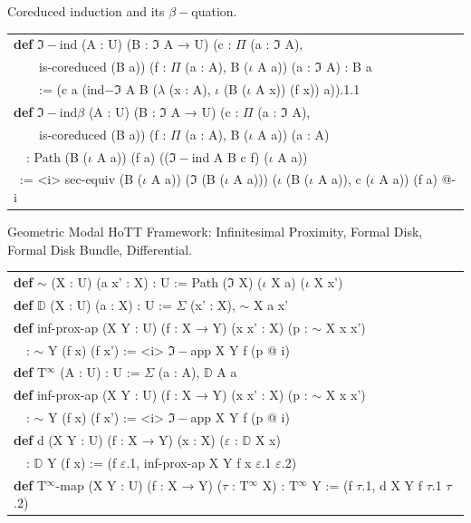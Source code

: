 \documentclass[a4paper,UKenglish,cleveref, autoref, thm-restate]{lipics-v2021}
\newcommand{\tabstyle}[0]{\scriptsize\ttfamily\fontseries{l}\selectfont}
\begin{document}
Coreduced induction and its $\beta-$quation.

\begin{table}[ht!]
\tabstyle
\begin{tabular}{l}
\textbf{def} $\Im-$ind (A : U) (B : $\Im$ A → U) (c : $\Pi$ (a : $\Im$ A), \\
\ \ \ \ is-coreduced (B a)) (f : $\Pi$ (a : A), B ($\iota$ A a)) (a : $\Im$ A) : B a \\
\ \ \ \ := (c a (ind$-\Im$ A B ($\lambda$ (x : A), $\iota$ (B ($\iota$ A x)) (f x)) a)).1.1 \\
\textbf{def} $\Im-$ind$\beta$ (A : U) (B : $\Im$ A → U) (c : $\Pi$ (a : $\Im$ A), \\
\ \ \ \ is-coreduced (B a)) (f : $\Pi$ (a : A), B ($\iota$ A a)) (a : A) \\
\ \ : Path (B ($\iota$ A a)) (f a) (($\Im-$ind A B c f) ($\iota$ A a)) \\
\ := <i> sec-equiv (B ($\iota$ A a)) ($\Im$ (B ($\iota$ A a))) ($\iota$ (B ($\iota$ A a)), c ($\iota$ A a)) (f a) @-i \\
\end{tabular}
\end{table}

Geometric Modal HoTT Framework: Infinitesimal Proximity, Formal Disk, Formal Disk Bundle, Differential.

\begin{table}[ht!]
\tabstyle
\begin{tabular}{l}
\textbf{def} $\sim$ (X : U) (a x' : X) : U := Path ($\Im$ X) ($\iota$ X a) ($\iota$ X x') \\
\textbf{def} $\mathbb{D}$ (X : U) (a : X) : U := $\Sigma$ (x' : X), $\sim$ X a x' \\
\textbf{def} inf-prox-ap (X Y : U) (f : X → Y) (x x' : X) (p : $\sim$ X x x') \\
\ \ : $\sim$ Y (f x) (f x') := <i> $\Im-$app X Y f (p @ i) \\
\textbf{def} T$^\infty$ (A : U) : U := $\Sigma$ (a : A), $\mathbb{D}$ A a \\
\textbf{def} inf-prox-ap (X Y : U) (f : X → Y) (x x' : X) (p : $\sim$ X x x') \\
\ \ : $\sim$ Y (f x) (f x') := <i> $\Im-$app X Y f (p @ i) \\
\textbf{def} d (X Y : U) (f : X → Y) (x : X) ($\varepsilon$ : $\mathbb{D}$ X x) \\
\ \ : $\mathbb{D}$ Y (f x) := (f $\varepsilon$.1, inf-prox-ap X Y f x $\varepsilon$.1 $\varepsilon$.2) \\
\textbf{def} T$^\infty$-map (X Y : U) (f : X → Y) ($\tau$ : T$^\infty$ X) : T$^\infty$ Y := (f $\tau$.1, d X Y f $\tau$.1 $\tau$.2) \\
\end{tabular}
\end{table}
\end{document}
